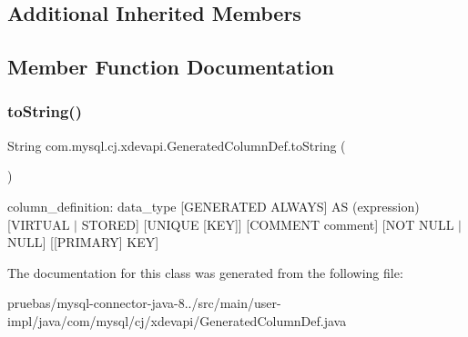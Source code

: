 \subsection*{Additional Inherited Members}


\subsection{Member Function Documentation}
\mbox{\label{classcom_1_1mysql_1_1cj_1_1xdevapi_1_1_generated_column_def_a65933e6c35c706b35df70c6404f88e8a}} 
\subsubsection{\texorpdfstring{to\+String()}{toString()}}
{\footnotesize\ttfamily String com.\+mysql.\+cj.\+xdevapi.\+Generated\+Column\+Def.\+to\+String (\begin{DoxyParamCaption}{ }\end{DoxyParamCaption})}

column\+\_\+definition\+: data\+\_\+type \mbox{[}G\+E\+N\+E\+R\+A\+T\+ED A\+L\+W\+A\+YS\mbox{]} AS (expression) \mbox{[}V\+I\+R\+T\+U\+AL $\vert$ S\+T\+O\+R\+ED\mbox{]} \mbox{[}U\+N\+I\+Q\+UE \mbox{[}K\+EY\mbox{]}\mbox{]} \mbox{[}C\+O\+M\+M\+E\+NT comment\mbox{]} \mbox{[}N\+OT N\+U\+LL $\vert$ N\+U\+LL\mbox{]} \mbox{[}\mbox{[}P\+R\+I\+M\+A\+RY\mbox{]} K\+EY\mbox{]} 

The documentation for this class was generated from the following file\+:\begin{DoxyCompactItemize}
\item 
pruebas/mysql-\/connector-\/java-\/8../src/main/user-\/impl/java/com/mysql/cj/xdevapi/Generated\+Column\+Def.\+java\end{DoxyCompactItemize}
